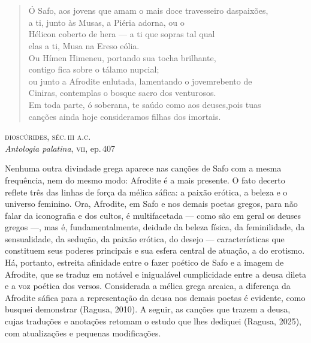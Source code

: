 \chapter*{}
\thispagestyle{empty}
\label{dioscurides}

\vspace*{\fill}
\begin{verse}
\small{Ó Safo, aos jovens que amam o mais doce travesseiro das\qb{}paixões,\\
a ti, junto às Musas, a Piéria adorna, ou o\\
Hélicon coberto de hera --- a ti que sopras tal qual\\
elas a ti, Musa na Ereso eólia.\\
Ou Hímen Himeneu, portando sua tocha brilhante,\\
contigo fica sobre o tálamo nupcial;\\
ou junto a Afrodite enlutada, lamentando o jovem\qb{}rebento de\\
Ciniras, contemplas o bosque sacro dos venturosos.\\
Em toda parte, ó soberana, te saúdo como aos deuses,\qb{}pois tuas\\
canções ainda hoje consideramos filhas dos imortais.}
\end{verse}

\begin{flushright}
\small{\textsc{dioscúrides, séc.\,iii a.c.}}\\
\small{\emph{Antologia palatina}, \textsc{vii}, ep.\,407}
\end{flushright}

\vspace*{\fill}

\setbeforesecskip{1.2\onelineskip}%
  \setaftersecskip{.35\onelineskip}%
  \setsecheadstyle{\large\baselineskip=.7\baselineskip\scshape\MakeTextLowercase}%

\begin{argumento}
Nenhuma outra divindade grega aparece nas canções de Safo com a mesma
frequência, nem do mesmo modo: Afrodite é a mais presente. O fato
decerto reflete três das linhas de força da mélica sáfica: a
paixão erótica, a beleza e o universo feminino. Ora, Afrodite, em Safo e nos
demais poetas gregos, para não falar da iconografia e dos cultos, é
multifacetada --- como são em geral os deuses gregos ---, mas é, fundamentalmente,
deidade da beleza física, da feminilidade, da sensualidade, da sedução, da
paixão erótica, do desejo --- características que constituem seus poderes
principais e sua esfera central de atuação, a do erotismo. Há, portanto,
estreita afinidade entre o fazer poético de Safo e a imagem de Afrodite, que se
traduz em notável e inigualável cumplicidade entre a deusa dileta e a voz
poética dos versos. Considerada a mélica grega arcaica, a diferença da Afrodite sáfica para a representação da deusa nos demais poetas é evidente, como busquei demonstrar (Ragusa, 2010).
A seguir, as canções que trazem a deusa, cujas traduções e anotações retomam o estudo que lhes dediquei (Ragusa, 2025), com atualizações e pequenas modificações.

\end{argumento}

